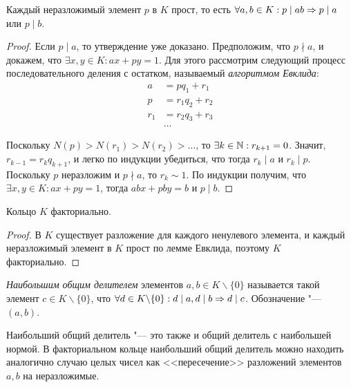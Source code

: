 \begin{proposition}
	Каждый неразложимый элемент $p$ в $K$ прост, то есть $\forall a, b \in K: p \mid ab \Rightarrow p \mid a$ или $p \mid b$.
\end{proposition}

\begin{proof}
	Если $p \mid a$, то утверждение уже доказано. Предположим, что $p \nmid a$, и докажем, что $\exists x, y \in K: ax + py = 1$. Для этого рассмотрим следующий процесс последовательного деления с остатком, называемый \textit{алгоритмом Евклида}:
	\begin{align*}
		a &= pq_1 + r_1\\
		p &= r_1q_2 + r_2\\
		r_1 &= r_2q_3 + r_3\\
		&\dots
	\end{align*}

	Поскольку $N(p) > N(r_1) > N(r_2) > \dotsc$, то $\exists k \in \mathbb{N}: r_{k + 1} = 0$. Значит, $r_{k - 1} = r_kq_{k+1}$, и легко по индукции убедиться, что тогда $r_k \mid a$ и $r_k \mid p$. Поскольку $p$ неразложим и $p \nmid a$, то $r_k \sim 1$. По индукции получим, что $\exists x, y \in K: ax + py = 1$, тогда $abx + pby = b$ и $p \mid b$.
\end{proof}

\begin{theorem}
	Кольцо $K$ факториально.
\end{theorem}

\begin{proof}
	В $K$ существует разложение для каждого ненулевого элемента, и каждый неразложимый элемент в $K$ прост по лемме Евклида, поэтому $K$ факториально.
\end{proof}

\begin{definition}
	\textit{Наибольшим общим делителем} элементов $a, b \in K \backslash \{0\}$ называется такой элемент $c \in K \backslash \{0\}$, что $\forall d \in K \backslash \{0\}: d \mid a, d \mid b \Rightarrow d \mid c$. Обозначение "--- $(a, b)$.
\end{definition}

\begin{note}
	Наибольший общий делитель "--- это также и общий делитель с наибольшей нормой. В факториальном кольце наибольший общий делитель можно находить аналогично случаю целых чисел как <<пересечение>> разложений элементов $a, b$ на неразложимые.
\end{note}